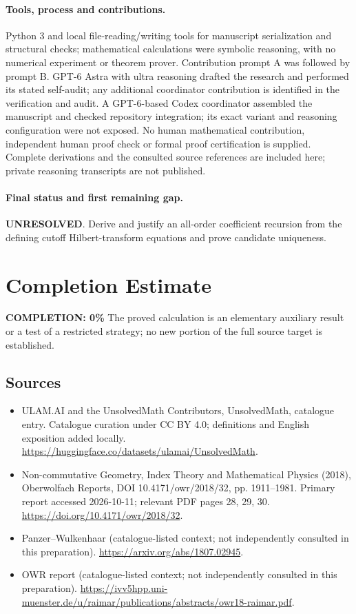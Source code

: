 \documentclass[11pt]{article}
\begin{document}
\paragraph{Tools, process and contributions.}
Python 3 and local file-reading/writing tools for manuscript serialization and structural checks; mathematical calculations were symbolic reasoning, with no numerical experiment or theorem prover. Contribution prompt A was followed by prompt B. GPT-6 Astra with ultra reasoning drafted the research and performed its stated self-audit; any additional coordinator contribution is identified in the verification and audit. A GPT-6-based Codex coordinator assembled the manuscript and checked repository integration; its exact variant and reasoning configuration were not exposed. No human mathematical contribution, independent human proof check or formal proof certification is supplied. Complete derivations and the consulted source references are included here; private reasoning transcripts are not published.

\paragraph{Final status and first remaining gap.}
\textbf{UNRESOLVED}. Derive and justify an all-order coefficient recursion from the defining cutoff Hilbert-transform equations and prove candidate uniqueness.

\section{Completion Estimate}
\noindent\textbf{COMPLETION: 0\%}
The proved calculation is an elementary auxiliary result or a test of a restricted strategy; no new portion of the full source target is established.

\subsection{Sources}
\begin{itemize}
\item[\hypertarget{source:statement:1}{S1}] ULAM.AI and the UnsolvedMath Contributors, UnsolvedMath, catalogue entry. Catalogue curation under CC BY 4.0; definitions and English exposition added locally.
\url{https://huggingface.co/datasets/ulamai/UnsolvedMath}.
\item[\hypertarget{source:statement:2}{S2}] Non-commutative Geometry, Index Theory and Mathematical Physics (2018), Oberwolfach Reports, DOI 10.4171/owr/2018/32, pp. 1911--1981. Primary report accessed 2026-10-11; relevant PDF pages 28, 29, 30.
\url{https://doi.org/10.4171/owr/2018/32}.
\item[\hypertarget{source:statement:3}{S3}] Panzer--Wulkenhaar (catalogue-listed context; not independently consulted in this preparation).
\url{https://arxiv.org/abs/1807.02945}.
\item[\hypertarget{source:statement:4}{S4}] OWR report (catalogue-listed context; not independently consulted in this preparation).
\url{https://ivv5hpp.uni-muenster.de/u/raimar/publications/abstracts/owr18-raimar.pdf}.
\end{itemize}
\label{end:statement}
\end{document}
